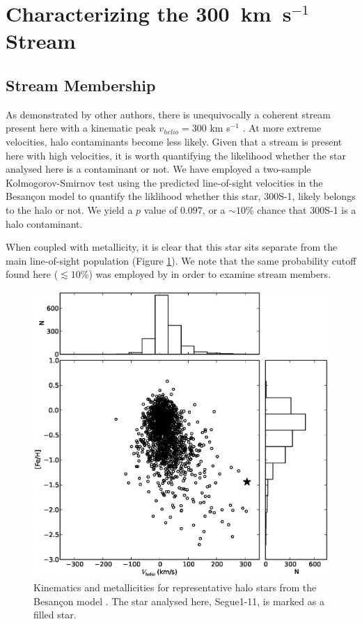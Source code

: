 \documentclass{emulateapj}
\begin{document}


\section{Characterizing the 300~km~s$^{-1}$ Stream}
\label{sec:char}

\subsection{Stream Membership}
As demonstrated by other authors, there is unequivocally a coherent stream present here with a kinematic peak $v_{helio} = 300$ km s$^{-1}$ \citep{Geha2009, Norris2010, Simon2011}. At more extreme velocities, halo contaminants become less likely. Given that a stream is present here with high velocities, it is worth quantifying the likelihood whether the star analysed here is a contaminant or not.
We have employed a two-sample Kolmogorov-Smirnov test using the predicted line-of-sight velocities in the Besan\c{c}on model \citep{Robin2003} to quantify the liklihood whether this star, 300S-1, likely belongs to the halo or not. We yield a $p$ value of $0.097$, or a $\sim10$\% chance that 300S-1 is a halo contaminant.

When coupled with metallicity, it is clear that this star sits separate from the main line-of-sight population (Figure \ref{fig:besancon}). We note that the same probability cutoff found here ($\lesssim10$\%) was employed by \citet{Simon2011} in order to examine stream members. 

\begin{figure}
  \includegraphics[width=\columnwidth]{besancon.eps}
  \caption{Kinematics and metallicities for representative halo stars from the Besan\c{c}on model \citep{Robin2003}. The star analysed here, Segue1-11, is marked as a filled star.}
  \label{fig:besancon}
\end{figure}
\end{document}
